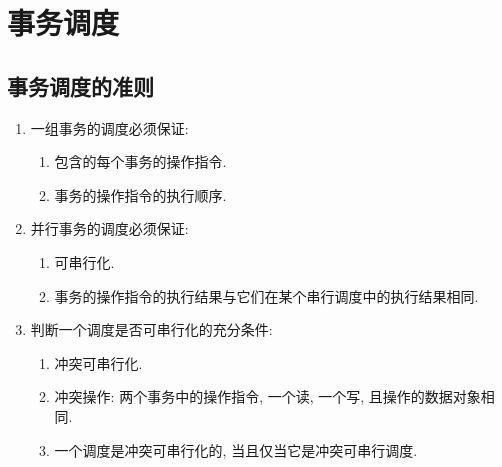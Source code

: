 \section{事务调度}
\subsection{事务调度的准则}
\begin{enumerate}[label=(\arabic*)]
    \item 一组事务的调度必须保证:
    \begin{enumerate}[label=\alph*.]
        \item 包含的每个事务的操作指令.
        \item 事务的操作指令的执行顺序.
    \end{enumerate}
    \item 并行事务的调度必须保证:
    \begin{enumerate}[label=\alph*.]
        \item 可串行化.
        \item 事务的操作指令的执行结果与它们在某个串行调度中的执行结果相同.
    \end{enumerate}
    \item 判断一个调度是否可串行化的充分条件:
    \begin{enumerate}[label=\alph*.]
        \item 冲突可串行化.
        \item 冲突操作: 两个事务中的操作指令, 一个读, 一个写, 且操作的数据对象相同.
        \item 一个调度是冲突可串行化的, 当且仅当它是冲突可串行调度.
    \end{enumerate}
\end{enumerate}
